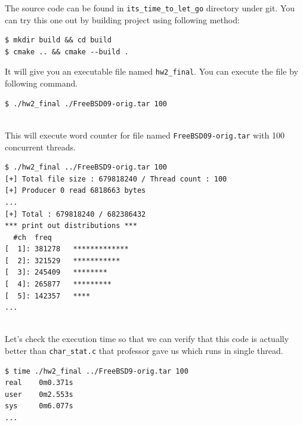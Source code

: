 \documentclass{homework}
\begin{document}
\par
The source code can be found in \texttt{its_time_to_let_go} directory under git. You can try this one out by building project using following method:
\\
\begin{center}
\begin{code}
\begin{verbatim}
$ mkdir build && cd build
$ cmake .. && cmake --build .
\end{verbatim}
\end{code}
\end{center}
\pagebreak
It will give you an executable file named \texttt{hw2_final}. You can execute the file by following command.
\\
\begin{center}
\begin{code}
\begin{verbatim}
$ ./hw2_final ./FreeBSD09-orig.tar 100
\end{verbatim}
\end{code}
\end{center}
\\
This will execute word counter for file named \texttt{FreeBSD09-orig.tar} with 100 concurrent threads.
\\
\begin{center}
\begin{code}
\begin{verbatim}
$ ./hw2_final ../FreeBSD9-orig.tar 100
[+] Total file size : 679818240 / Thread count : 100
[+] Producer 0 read 6818663 bytes
...
[+] Total : 679818240 / 682386432
*** print out distributions ***
  #ch  freq
[  1]: 381278   *************
[  2]: 321529   ***********
[  3]: 245409   ********
[  4]: 265877   *********
[  5]: 142357   ****
...
\end{verbatim}
\end{code}
\end{center}
\\
Let's check the execution time so that we can verify that this code is actually better than \texttt{char_stat.c} that professor gave us which runs in single thread.
\\
\begin{center}
\begin{code}
\begin{verbatim}
$ time ./hw2_final ../FreeBSD9-orig.tar 100
real    0m0.371s
user    0m2.553s
sys     0m6.077s
...
\end{verbatim}
\end{code}
\end{center}
\end{document}
